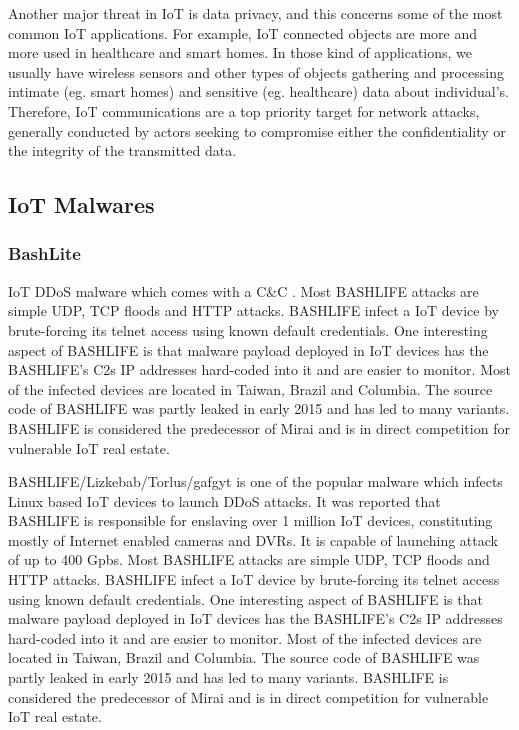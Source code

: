 Another major threat in IoT is data privacy, and this concerns some of the most common IoT applications. For example, IoT connected objects are more and more used in healthcare and smart homes. In those kind of applications, we usually have wireless sensors and other types of objects gathering and processing intimate (eg. smart homes) and sensitive (eg. healthcare) data about individual’s. Therefore, IoT communications are a top priority target for network attacks, generally conducted by actors seeking to compromise either the confidentiality or the integrity of the transmitted data.

\subsection{IoT Malwares}

\subsubsection{BashLite}

IoT DDoS malware which comes with a C\&C \cite{securityintelligence}. Most BASHLIFE attacks are simple UDP, TCP floods and HTTP attacks. BASHLIFE infect a IoT device by brute-forcing its telnet access using known default credentials. One interesting aspect of BASHLIFE is that malware payload deployed in IoT devices has the BASHLIFE's C2s IP addresses hard-coded into it and are easier to monitor. Most of the infected devices are located in Taiwan, Brazil and Columbia. The source code of BASHLIFE was partly leaked in early 2015 and has led to many variants. BASHLIFE is considered the predecessor of Mirai and is in direct competition for vulnerable IoT real estate.

BASHLIFE/Lizkebab/Torlus/gafgyt is one of the popular malware which infects Linux based IoT devices to launch DDoS attacks. It was reported that BASHLIFE is responsible for enslaving over 1 million IoT devices, constituting mostly of Internet enabled cameras and DVRs. It is capable of launching attack of up to 400 Gpbs. Most BASHLIFE attacks are simple UDP, TCP floods and HTTP attacks. BASHLIFE infect a IoT device by brute-forcing its telnet access using known default credentials. One interesting aspect of BASHLIFE is that malware payload deployed in IoT devices has the BASHLIFE's C2s IP addresses hard-coded into it and are easier to monitor. Most of the infected devices are located in Taiwan, Brazil and Columbia. The source code of BASHLIFE was partly leaked in early 2015 and has led to many variants. BASHLIFE is considered the predecessor of Mirai and is in direct competition for vulnerable IoT real estate.

